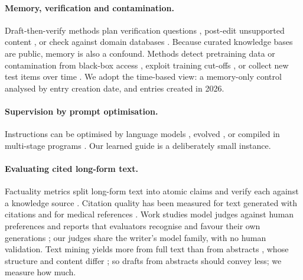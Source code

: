 \documentclass{article} %
\begin{document}
\paragraph{Memory, verification and contamination.}
Draft-then-verify methods plan verification questions \citep{dhuliawala2024chainofverification}, post-edit unsupported content \citep{Gao2022RarrResearching}, or check against domain databases \citep{wang2025geneagent}. Because curated knowledge bases are public, memory is also a confound. Methods detect pretraining data or contamination from black-box access \citep{Shi2023DetectingPretraining,oren2024proving,golchin2024time,Golchin2025DataContamination}, exploit training cut-offs \citep{Roberts2023DataContamination}, or collect new test items over time \citep{Jain2024LivecodebenchHolistic,White2024LivebenchChallenging}. We adopt the time-based view: a memory-only control analysed by entry creation date, and entries created in 2026.

\paragraph{Supervision by prompt optimisation.}
Instructions can be optimised by language models \citep{Zhou2022LargeLanguage,Pryzant2023AutomaticPrompt,Yang2023LargeLanguage}, evolved \citep{Guo2023EvopromptConnecting,Fernando2023PromptbreederSelfreferential,agrawal2026gepa}, or compiled in multi-stage programs \citep{Khattab2023DspyCompiling,Opsahlong2024OptimizingInstructions}. Our learned guide is a deliberately small instance.

\paragraph{Evaluating cited long-form text.}
Factuality metrics split long-form text into atomic claims and verify each against a knowledge source \citep{min2023factscore,wei2024longform}. Citation quality has been measured for text generated with citations \citep{gao2023enabling} and for medical references \citep{wu2025automated}. Work studies model judges against human preferences \citep{zheng2023judging,shankar2024who} and reports that evaluators recognise and favour their own generations \citep{panickssery2024llm}; our judges share the writer's model family, with no human validation. Text mining yields more from full text than from abstracts \citep{Westergaard2018ComprehensiveQuantitative}, whose structure and content differ \citep{Cohen2010StructuralContent}; so drafts from abstracts should convey less; we measure how much.
\end{document}
